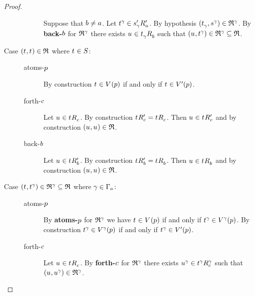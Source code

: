 \begin{proof}
\begin{description}
\begin{description}
                Suppose that $\agentB \neq \agentA$.
                Let $\kStateT[\gamma] \in \kSuccessorsPA{\kStateSP_\gamma}$.
                By hypothesis $(\kStateT_\gamma, \kStateS[\gamma]) \in \refinement^\gamma$.
                By {\bf back-$\agentB$} for $\refinement^\gamma$ there exists $\kStateU \in \kSuccessorsB{\kStateT_\gamma}$ such that $(\kStateU, \kStateT[\gamma]) \in \refinement^\gamma \subseteq \refinement$.
        \end{description}
    \item[{Case $(\kStateT, \kStateT) \in \refinement$ where $\kStateT \in \kStates$:}]
        \hfill
        \begin{description}
            \item[atoms-$\atomP$] 
                By construction $\kStateT \in \kValuation(\atomP)$ if and only if $\kStateT \in \kValuationP(\atomP)$.
            \item[forth-$\agentC$]
                Let $\kStateU \in \kSuccessorsC{\kStateT}$.
                By construction $\kSuccessorsPC{\kStateT} = \kSuccessorsC{\kStateT}$.
                Then $\kStateU \in \kSuccessorsPC{\kStateT}$ and by construction $(\kStateU, \kStateU) \in \refinement$.
            \item[back-$\agentB$]
                Let $\kStateU \in \kSuccessorsPB{\kStateT}$.
                By construction $\kSuccessorsPB{\kStateT} = \kSuccessorsB{\kStateT}$.
                Then $\kStateU \in \kSuccessorsB{\kStateT}$ and by construction $(\kStateU, \kStateU) \in \refinement$.
        \end{description}
    \item[{Case $(\kStateT, \kStateT[\gamma]) \in \refinement^\gamma \subseteq \refinement$ where $\gamma \in \Gamma_\agentA$:}]
        \hfill
        \begin{description}
            \item[atoms-$\atomP$] 
                By {\bf atoms-$\atomP$} for $\refinement^\gamma$ we have $\kStateT \in \kValuation(\atomP)$ if and only if $\kStateT[\gamma] \in \kValuation[\gamma](\atomP)$.
                By construction $\kStateT[\gamma] \in \kValuation[\gamma](\atomP)$ if and only if $\kStateT[\gamma] \in \kValuationP(\atomP)$.
            \item[forth-$\agentC$]
                Let $\kStateU \in \kSuccessorsC{\kStateT}$.
                By {\bf forth-$\agentC$} for $\refinement^\gamma$ there exists $\kStateU[\gamma] \in \kSuccessorsC[\gamma]{\kStateT[\gamma]}$ such that $(\kStateU, \kStateU[\gamma]) \in \refinement^\gamma$.

\end{description}
\end{description}
\end{proof}
